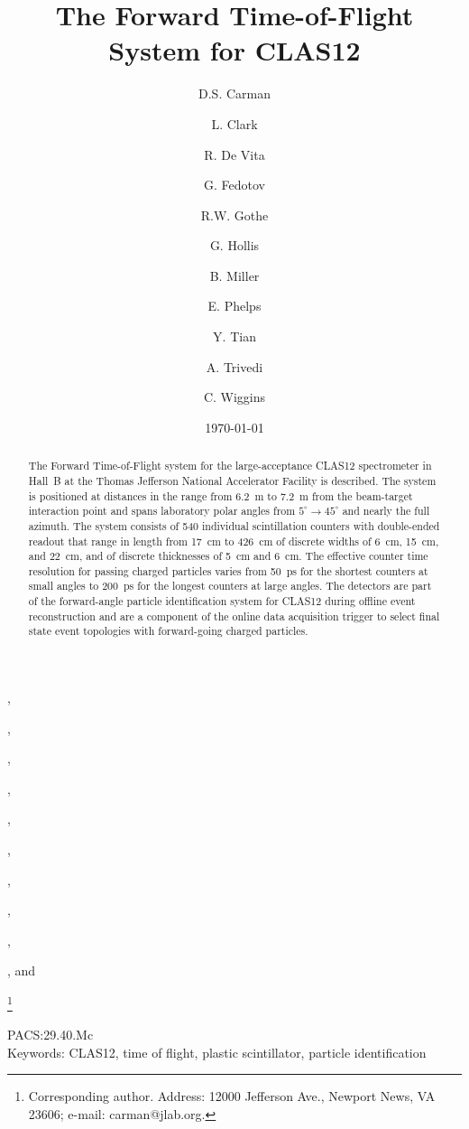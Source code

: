 \documentclass{elsart}
\begin{document}
\begin{frontmatter}

\title{The Forward Time-of-Flight System for CLAS12}

\author[JLab]{D.S. Carman},
\author[Glasgow]{L. Clark},
\author[INFN]{R. De Vita},
\author[USC]{G. Fedotov},
\author[USC]{R.W. Gothe},
\author[USC]{G. Hollis},
\author[JLab]{B. Miller},
\author[USC]{E. Phelps},
\author[USC]{Y. Tian},
\author[USC]{A. Trivedi}, and
\author[JLab]{C. Wiggins}

\address[JLab]{Thomas Jefferson National Accelerator Facility, Newport News, VA 23606, USA}
\address[USC]{University of South Carolina, Columbia, SC 29208, USA}
\address[Glasgow]{University of Glasgow, Glasgow G12 8QQ, United Kingdom}
\address[INFN]{INFN, Sezione di Genova, 16146 Genova, Italy}
\thanks[corresponding]{Corresponding author. Address: 12000 Jefferson Ave., Newport News, VA 23606; 
e-mail: carman@jlab.org.}

\date{\today}


\begin{abstract}
The Forward Time-of-Flight system for the large-acceptance CLAS12 spectrometer in Hall~B at the
Thomas Jefferson National Accelerator Facility is described. The system is positioned at distances
in the range from 6.2~m to 7.2~m from the beam-target interaction point and spans laboratory polar
angles from $5^\circ \to 45^\circ$ and nearly the full azimuth. The system consists of 540 individual
scintillation counters with double-ended readout that range in length from 17~cm to 426~cm of
discrete widths of 6~cm, 15~cm, and 22~cm, and of discrete thicknesses of 5~cm and 6~cm. The
effective counter time resolution for passing charged particles varies from 50~ps for the shortest
counters at small angles to 200~ps for the longest counters at large angles. The detectors are part
of the forward-angle particle identification system for CLAS12 during offline event reconstruction
and are a component of the online data acquisition trigger to select final state event topologies with
forward-going charged particles.
\end{abstract}

\end{frontmatter}

PACS:29.40.Mc \\
Keywords: CLAS12, time of flight, plastic scintillator, particle identification
\newpage
\end{document}
